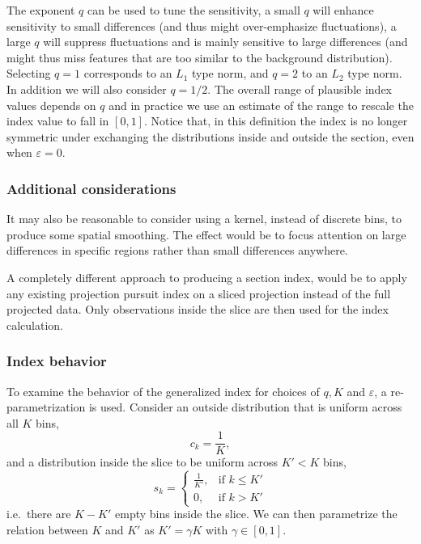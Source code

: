 \documentclass[]{interact}
\theoremstyle{plain}%
\theoremstyle{definition}
\theoremstyle{remark}
\begin{document}
The exponent \(q\) can be used to tune the sensitivity, a small \(q\)
will enhance sensitivity to small differences (and thus might
over-emphasize fluctuations), a large \(q\) will suppress fluctuations
and is mainly sensitive to large differences (and might thus miss
features that are too similar to the background distribution). Selecting
\(q=1\) corresponds to an \(L_1\) type norm, and \(q=2\) to an \(L_2\)
type norm. In addition we will also consider \(q=1/2\). The overall
range of plausible index values depends on \(q\) and in practice we use
an estimate of the range to rescale the index value to fall in
\([0,1]\). Notice that, in this definition the index is no longer
symmetric under exchanging the distributions inside and outside the
section, even when \(\varepsilon=0\).

\hypertarget{additional-considerations}{%
\subsubsection{Additional
considerations}\label{additional-considerations}}

It may also be reasonable to consider using a kernel, instead of
discrete bins, to produce some spatial smoothing. The effect would be to
focus attention on large differences in specific regions rather than
small differences anywhere.

A completely different approach to producing a section index, would be
to apply any existing projection pursuit index on a sliced projection
instead of the full projected data. Only observations inside the slice
are then used for the index calculation.

\hypertarget{index-behavior}{%
\subsubsection{\texorpdfstring{Index behavior
\label{sec:behaviour}}{Index behavior }}\label{index-behavior}}

To examine the behavior of the generalized index for choices of \(q, K\)
and \(\varepsilon\), a re-parametrization is used. Consider an outside
distribution that is uniform across all \(K\) bins, \begin{equation}
c_{k} = \frac{1}{K},
\end{equation} and a distribution inside the slice to be uniform across
\(K' < K\) bins, \begin{equation}
s_{k} = \begin{cases}
    \frac{1}{K'}, & \text{if $k \leq K'$}\\
    0, & \text{if $k > K'$}
  \end{cases}
\end{equation} i.e.~there are \(K-K'\) empty bins inside the slice. We
can then parametrize the relation between \(K\) and \(K'\) as
\(K' = \gamma K\) with \(\gamma \in [0,1]\).
\end{document}
